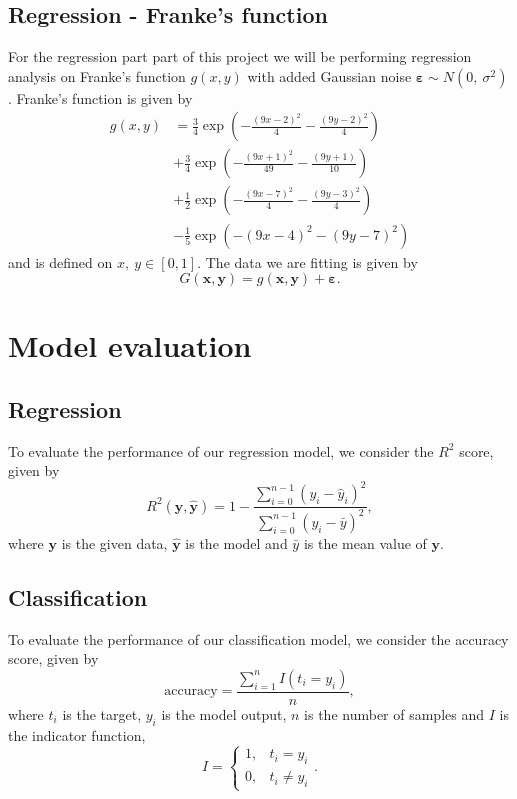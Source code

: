 \documentclass[a4paper, 11pt, twocolumn]{article}
\begin{document}
\subsection{Regression - Franke's function}
For the regression part part of this project we will be performing regression analysis on Franke's function $g(x,y)$ with added Gaussian noise $\bm{\varepsilon} \sim N(0,\  \sigma^2) $. Franke's function is given by 
\begin{align}
g(x,y) &= \frac{3}{4}\exp{\left(-\frac{(9x-2)^2}{4}   - \frac{(9y-2)^2}{4}\right)} \nonumber\\
 &+\frac{3}{4}\exp{\left(-\frac{(9x+1)^2}{49}- \frac{(9y+1)}{10}\right)} \nonumber\\
 &+\frac{1}{2}\exp{\left(-\frac{(9x-7)^2}{4} - \frac{(9y-3)^2}{4}\right)} \nonumber\\
 &-\frac{1}{5}\exp{\left(-(9x-4)^2 - (9y-7)^2\right) }  \label{eq:Franke}
\end{align} and is defined on $x,\ y \in [0,1]$. The data we are fitting is given by 
$$G(\bm{x}, \bm{y}) = g(\bm{x}, \bm{y}) + \bm{\varepsilon}.$$
\section{Model evaluation}
\subsection{Regression}
To evaluate the performance of our regression model, we consider the $R^2$ score, given by 
\begin{equation}
    R^2(\bm{y}, \bm{\hat{y}}) = 1 - \frac{\sum_{i=0}^{n - 1} (y_i - \hat{y}_i)^2}{\sum_{i=0}^{n - 1} (y_i - \bar{y})^2},
    \label{eq:R2}
\end{equation}
where $\bm{y}$ is the given data, $\bm{\hat{y}}$ is the model and ${\bar{y}}$ is the mean value of $\bm{y}$.
\subsection{Classification}
To evaluate the performance of our classification model, we consider the accuracy score, given by 
\begin{equation}
\label{eq:accuracy}
\text{accuracy}=\frac{\sum_{i=1}^nI(t_i=y_i)}{n},
\end{equation}
where $t_i$ is the target, $y_i$ is the model output, $n$ is the number of samples and $I$ is the indicator function, 
\[
I = \begin{cases} 
1, & t_i = y_i\\
0, & t_i \neq y_i
\end{cases} .
\]
\end{document}
